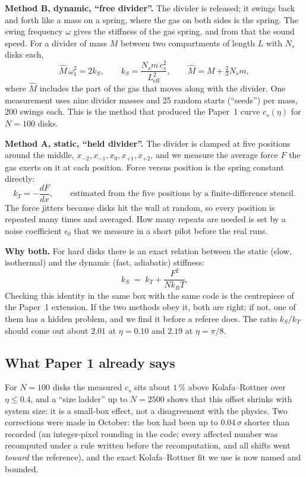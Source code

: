 \documentclass[11pt]{article}
\begin{document}
\textbf{Method B, dynamic, ``free divider''.} The divider is released; it swings back and forth like a mass on a spring, where the gas on both sides is the spring. The swing frequency $\omega$ gives the stiffness of the gas spring, and from that the sound speed. For a divider of mass $M$ between two compartments of length $L$ with $N_s$ disks each,
\begin{equation}
\hat M\,\omega_1^2 = 2 k_S, \qquad k_S = \frac{N_s m\, c_s^2}{L_{\mathrm{eff}}^2}, \qquad \hat M = M + \tfrac{2}{3} N_s m ,
\end{equation}
where $\hat M$ includes the part of the gas that moves along with the divider. One measurement uses nine divider masses and 25 random starts (``seeds'') per mass, 200 swings each. This is the method that produced the Paper~1 curve $c_s(\eta)$ for $N = 100$ disks.

\textbf{Method A, static, ``held divider''.} The divider is clamped at five positions around the middle, $x_{-2}, x_{-1}, x_0, x_{+1}, x_{+2}$, and we measure the average force $F$ the gas exerts on it at each position. Force versus position is the spring constant directly:
\begin{equation}
k_T = -\frac{dF}{dx}, \qquad \text{estimated from the five positions by a finite-difference stencil.}
\end{equation}
The force jitters because disks hit the wall at random, so every position is repeated many times and averaged. How many repeats are needed is set by a noise coefficient $\epsilon_0$ that we measure in a short pilot before the real runs.

\textbf{Why both.} For hard disks there is an exact relation between the static (slow, isothermal) and the dynamic (fast, adiabatic) stiffness:
\begin{equation}
k_S \;=\; k_T + \frac{F^2}{N k_B T}.
\label{eq:identity}
\end{equation}
Checking this identity in the same box with the same code is the centrepiece of the Paper~1 extension. If the two methods obey it, both are right; if not, one of them has a hidden problem, and we find it before a referee does. The ratio $k_S/k_T$ should come out about $2.01$ at $\eta = 0.10$ and $2.19$ at $\eta = \pi/8$.

\subsection{What Paper 1 already says}
For $N = 100$ disks the measured $c_s$ sits about $1\,\%$ above Kolafa--Rottner over $\eta \le 0.4$, and a ``size ladder'' up to $N = 2500$ shows that this offset shrinks with system size: it is a small-box effect, not a disagreement with the physics. Two corrections were made in October: the box had been up to $0.04\,\sigma$ shorter than recorded (an integer-pixel rounding in the code; every affected number was recomputed under a rule written before the recomputation, and all shifts went \emph{toward} the reference), and the exact Kolafa--Rottner fit we use is now named and bounded.
\end{document}

